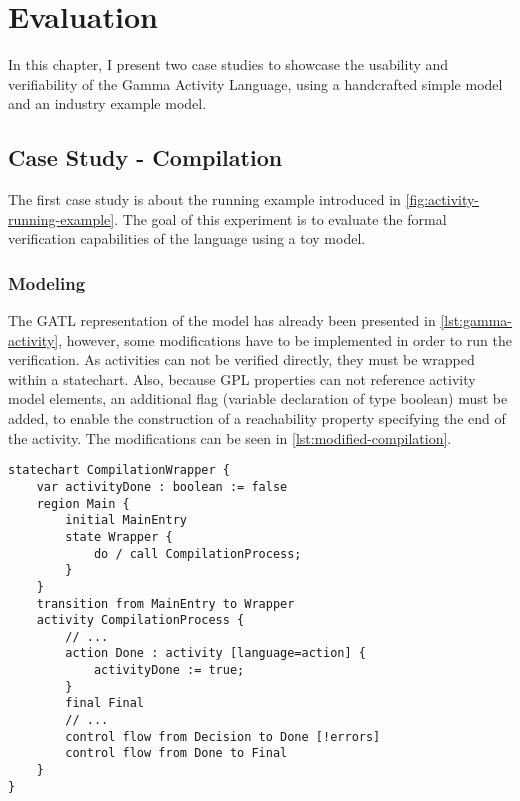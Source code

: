 \chapter{Evaluation}\label{ch:evaluation}

In this chapter, I present two case studies to showcase the usability and verifiability of the Gamma Activity Language, using a handcrafted simple model and an industry example model.

\section{Case Study - Compilation}

The first case study is about the running example introduced in \autoref{fig:activity-running-example}. The goal of this experiment is to evaluate the formal verification capabilities of the language using a toy model.

\subsection{Modeling}

The GATL representation of the model has already been presented in \autoref{lst:gamma-activity}, however, some modifications have to be implemented in order to run the verification. As activities can not be verified directly, they must be wrapped within a statechart. Also, because GPL properties can not reference activity model elements, an additional flag (variable declaration of type boolean) must be added, to enable the construction of a reachability property specifying the end of the activity. The modifications can be seen in \autoref{lst:modified-compilation}.

\begin{lstlisting}[language=statechart, linewidth=0.80\textwidth, xleftmargin=0.20\textwidth, caption={The textual representation of the modified compilation example.}, label={lst:modified-compilation}]
statechart CompilationWrapper {
	var activityDone : boolean := false
	region Main {
		initial MainEntry
		state Wrapper {
			do / call CompilationProcess;
		}
	}
	transition from MainEntry to Wrapper
	activity CompilationProcess {
		// ...
		action Done : activity [language=action] {
			activityDone := true;
		}
		final Final
		// ...
		control flow from Decision to Done [!errors]
		control flow from Done to Final
	}
}
\end{lstlisting}

